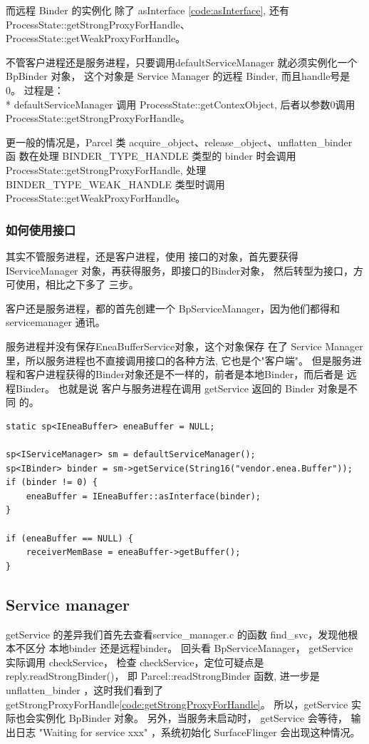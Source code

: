 \documentclass[a4paper,11pt]{article}
\begin{document}
而远程 Binder 的实例化 除了 asInterface \ref{code:asInterface},
还有 ProcessState::getStrongProxyForHandle\label{code:getStrongProxyForHandle}、
ProcessState::getWeakProxyForHandle。

不管客户进程还是服务进程，只要调用defaultServiceManager 就必须实例化一个
BpBinder 对象， 这个对象是 Service Manager 的远程 Binder, 而且handle号是0。
过程是：\\*
defaultServiceManager 调用 ProcessState::getContexObject, 后者以参数0调用
ProcessState::getStrongProxyForHandle。

更一般的情况是，Parcel 类 acquire_object、release_object、unflatten_binder 函
数在处理 BINDER_TYPE_HANDLE 类型的 binder 时会调用
ProcessState::getStrongProxyForHandle, 处理 BINDER_TYPE_WEAK_HANDLE 类型时调用
ProcessState::getWeakProxyForHandle。


\subsubsection{如何使用接口}
其实不管服务进程，还是客户进程，使用 接口的对象，首先要获得IServiceManager
对象，再获得服务，即接口的Binder对象， 然后转型为接口，方可使用，相比之下多了
三步。

客户还是服务进程，都的首先创建一个 BpServiceManager，因为他们都得和 servicemanager 通讯。

服务进程并没有保存EneaBufferService对象，这个对象保存
在了 Service Manager里，所以服务进程也不直接调用接口的各种方法, 它也是个"客户端"。
但是服务进程和客户进程获得的Binder对象还是不一样的，前者是本地Binder，而后者是
远程Binder。 也就是说 客户与服务进程在调用 getService 返回的 Binder 对象是不同
的。
\begin{lstlisting}
static sp<IEneaBuffer> eneaBuffer = NULL;

sp<IServiceManager> sm = defaultServiceManager();
sp<IBinder> binder = sm->getService(String16("vendor.enea.Buffer"));
if (binder != 0) {
    eneaBuffer = IEneaBuffer::asInterface(binder);
}

if (eneaBuffer == NULL) {
    receiverMemBase = eneaBuffer->getBuffer();
}
\end{lstlisting}


    \subsection{Service manager}\label{process:servicemanager}
    getService 的差异我们首先去查看service_manager.c 的函数 find_svc，发现他根
    本不区分 本地binder 还是远程binder。 回头看 BpServiceManager， getService
    实际调用 checkService， 检查 checkService，定位可疑点是
    reply.readStrongBinder()， 即 Parcel::readStrongBinder 函数, 进一步是
    unflatten_binder ，这时我们看到了
    getStrongProxyForHandle\ref{code:getStrongProxyForHandle}。
所以，getService 实际也会实例化 BpBinder 对象。
 另外，当服务未启动时， getService 会等待， 输出日志 "Waiting for service xxx"
 ，系统初始化 SurfaceFlinger 会出现这种情况。
\end{document}

